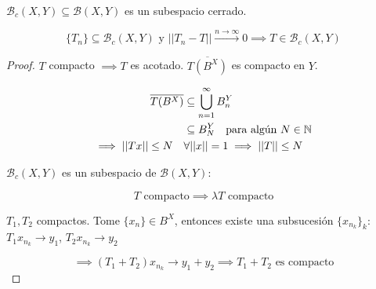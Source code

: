  \begin{ftheorem}
    $\mathcal{B}_c(X,Y)\subseteq \mathcal{B}(X,Y)$ es un subespacio cerrado. 

    \[\{T_n\}\subseteq \mathcal{B}_c(X,Y)\text{ y }||T_n-T||\xrightarrow{n\to\infty} 0\implies T\in \mathcal{B}_c(X,Y)\]
 \end{ftheorem}

 \begin{proof}
    $T$ compacto $\implies T$ es acotado. $\overline{T(B^X)}$ es compacto en $Y$.

    \begin{align*}
        \overline{T(B^X)}&\subseteq \bigcup_{n=1}^\infty B_n^Y\\
        &\subseteq B_N^Y\quad\text{para algún $N\in \mathbb{N}$}\\
        \implies ||Tx||\leq N\quad&\forall ||x||=1\implies ||T||\leq N
    \end{align*}

    $\mathcal{B}_c(X,Y)$ es un subespacio de $\mathcal{B}(X,Y)$:

    \[T\text{ compacto}\implies \lambda T\text{ compacto}\]

    $T_1,T_2$ compactos. Tome $\{x_n\}\in B^X$, entonces existe una subsucesión $\{x_{n_k}\}_k$: $T_1 x_{n_k}\to y_1$, $T_2x_{n_k}\to y_2$

    \[\implies (T_1+T_2)x_{n_k}\to y_1+y_2\implies T_1+T_2\text{ es compacto}\]
 \end{proof}